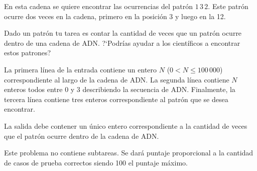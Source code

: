 \documentclass{oci}
\begin{document}
\begin{problemDescription}
  En esta cadena se quiere encontrar las ocurrencias del patrón $1\,3\,2$.
  Este patrón ocurre dos veces en la cadena, primero en la posición 3 y luego
  en la 12.
  
  Dado un patrón tu tarea es contar la cantidad de veces que un patrón ocurre
  dentro de una cadena de ADN.
  ?`Podrías ayudar a los científicos a encontrar estos patrones?
\end{problemDescription}

\begin{inputDescription}
  La primera línea de la entrada contiene un entero $N$ ($0 < N \leq 100\,000$)
  correspondiente al largo de la cadena de ADN.
  La segunda línea contiene $N$ enteros todos entre 0 y 3 describiendo la
  secuencia de ADN.
  Finalmente, la tercera línea contiene tres enteros correspondiente al patrón que
  se desea encontrar.
\end{inputDescription}

\begin{outputDescription}
  La salida debe contener un único entero correspondiente a la cantidad de veces
  que el patrón ocurre dentro de la cadena de ADN.
\end{outputDescription}

\begin{scoreDescription}
  Este problema no contiene subtareas.
  Se dará puntaje proporcional a la cantidad de casos de prueba correctos siendo
  100 el puntaje máximo.
\end{scoreDescription}

\begin{sampleDescription}
\end{sampleDescription}
\end{document}
